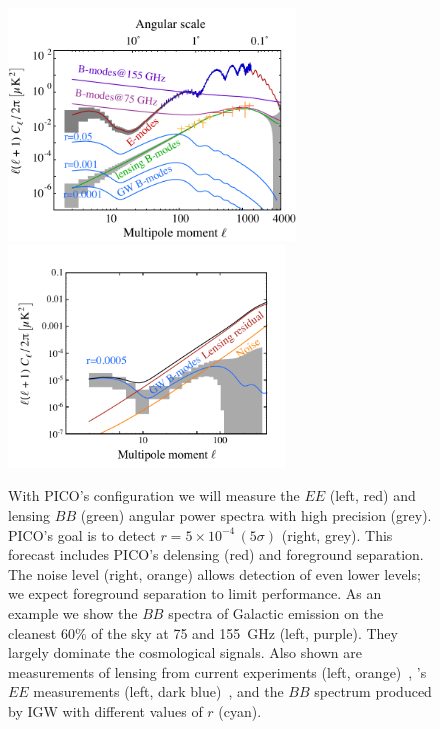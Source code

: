 \documentclass[PICOReport.tex]{subfiles}
\begin{document}
\begin{figure}[!thb]
\centering
\hspace{-0.15in}
\includegraphics[width=3in]{images/cmb_powspec_PICOv4p1_v2.pdf}
\hspace{-0.15in}
\includegraphics[width=2.9in,trim= 0cm 0.2cm 0cm 0cm]{images/cmbbb_powspec_PICOv4p1.pdf}
\caption{\captiontext With PICO's  configuration we will measure the $EE$ (left, red) and lensing $BB$ (green) angular power spectra with high precision (grey). PICO's goal is to detect $r= 5\times 10^{-4}\, (5\sigma)$ (right, grey). This forecast includes PICO's  delensing (red) and foreground separation. The  noise level (right, orange) allows detection of even lower levels; we expect foreground separation to limit performance.  As an example we show the $BB$ spectra of Galactic emission on the cleanest $60\%$ of the sky at 75 and 155~GHz (left, purple). They largely dominate the cosmological signals. Also shown are measurements of lensing from current experiments (left, orange)~\citep{PB_BB, keisler2015, actpol_lensing_BB, Array:2015xqh}, \planck 's $EE$ measurements (left, dark blue)~\citep{Planck2018_I}, and the $BB$ spectrum produced by \ac{IGW} with different values of $r$ (cyan). }
\label{fig:clbb}
\end{figure}
\end{document}
